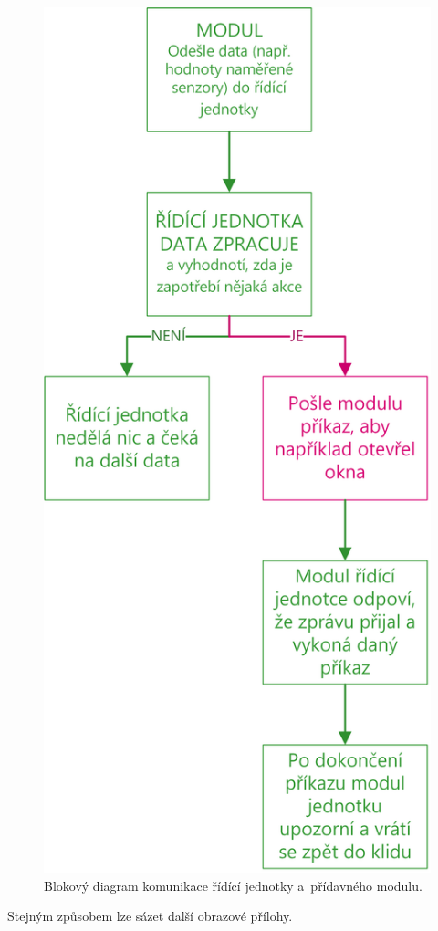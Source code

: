 \begin{figure}[h]
    \centering
    \includegraphics[scale=0.9]{img/SOFTWARE/KOMUNIKACE_MODULU.png}
    \caption{Blokový diagram komunikace řídící jednotky a~přídavného modulu.}
    \label{fig:PPCU-to-MODULE-communication}
\end{figure}

Stejným způsobem lze sázet další obrazové přílohy.
\newpage